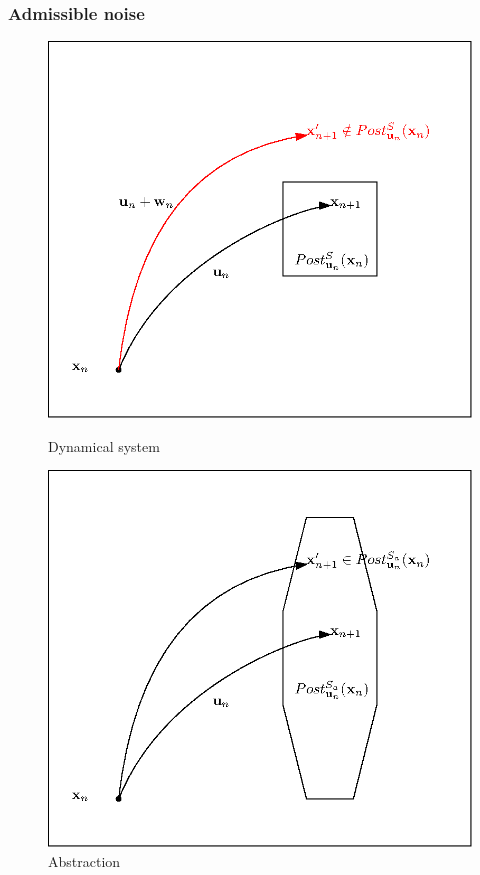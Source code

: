 \documentclass{beamer}
\begin{document}
\begin{frame}
\frametitle{Admissible noise}

\begin{figure}
\begin{minipage}{0.45\textwidth}
\centering
\includegraphics[width=\textwidth]{noise_1}
\caption{Dynamical system}
\end{minipage}
\pause
\begin{minipage}{0.45\textwidth}
\centering
\includegraphics[width=\textwidth]{noise_2}
\caption{Abstraction}
\end{minipage}
\end{figure}

\end{frame}
\end{document}
